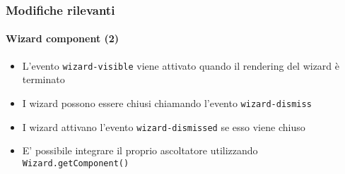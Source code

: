 \begin{frame}[fragile]
	\frametitle{Modifiche rilevanti}
	\framesubtitle{Wizard component (2)}

	\lstset{basicstyle=\tiny\ttfamily}

	\begin{itemize}

		\item L'evento \texttt{wizard-visible} viene attivato quando il rendering del wizard è terminato

		\item I wizard possono essere chiusi chiamando l'evento \texttt{wizard-dismiss}

		\item I wizard attivano l'evento \texttt{wizard-dismissed} se esso viene chiuso

		\item E' possibile integrare il proprio ascoltatore utilizzando \texttt{Wizard.getComponent()}

	\end{itemize}

\end{frame}

